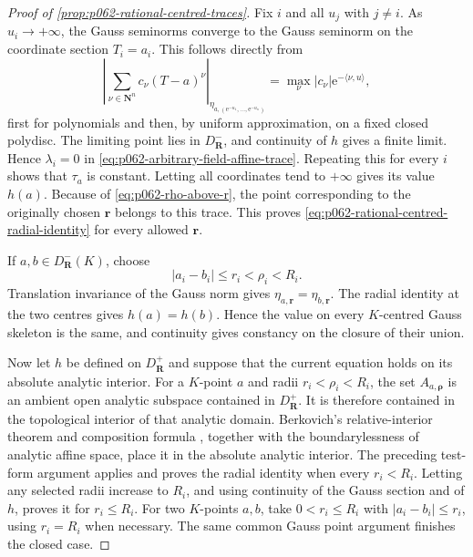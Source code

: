 \begin{proof}[Proof of \cref{prop:p062-rational-centred-traces}]
Fix \(i\) and all \(u_j\) with \(j\ne i\).  As \(u_i\to+\infty\), the
Gauss seminorms converge to the Gauss seminorm on the coordinate section
\(T_i=a_i\).  This follows directly from
\[
 \left|\sum_{\nu\in\mathbf N^n}c_\nu(T-a)^\nu\right|_{
      \eta_{a,(\mathrm e^{-u_1},\ldots,\mathrm e^{-u_n})}}
       =\max_\nu |c_\nu|\mathrm e^{-\langle\nu,u\rangle},
\]
first for polynomials and then, by uniform approximation, on a fixed
closed polydisc.  The limiting point lies in \(D^-_{\mathbf R}\), and
continuity of \(h\) gives a finite limit.  Hence \(\lambda_i=0\) in
\eqref{eq:p062-arbitrary-field-affine-trace}.  Repeating this for every
\(i\) shows that \(\tau_a\) is constant.  Letting all coordinates tend
to \(+\infty\) gives its value \(h(a)\).  Because of
\eqref{eq:p062-rho-above-r}, the point corresponding to the originally
chosen \(\mathbf r\) belongs to this trace.  This proves
\eqref{eq:p062-rational-centred-radial-identity} for every allowed
\(\mathbf r\).

If \(a,b\in D^-_{\mathbf R}(K)\), choose
\[
                  |a_i-b_i|\leq r_i<\rho_i<R_i.
\]
Translation invariance of the Gauss norm gives
\(\eta_{a,\mathbf r}=\eta_{b,\mathbf r}\).  The radial identity at the
two centres gives \(h(a)=h(b)\).  Hence the value on every \(K\)-centred
Gauss skeleton is the same, and continuity gives constancy on the closure
of their union.

Now let \(h\) be defined on \(D^+_{\mathbf R}\) and suppose that the
current equation holds on its absolute analytic interior.  For a
\(K\)-point \(a\) and radii \(r_i<\rho_i<R_i\), the set
\(A_{a,\boldsymbol\rho}\) is an ambient open analytic subspace contained
in \(D^+_{\mathbf R}\).  It is therefore contained in the topological
interior of that analytic domain.  Berkovich's relative-interior theorem
and composition formula
\cite[Proposition~1.5.5(i)--(ii)]{Berk93}, together with the
boundarylessness of analytic affine space, place it in the absolute
analytic interior.  The preceding test-form argument applies and proves
the radial identity when every \(r_i<R_i\).  Letting any selected radii
increase to \(R_i\), and using continuity of the Gauss section and of
\(h\), proves it for \(r_i\leq R_i\).  For two \(K\)-points \(a,b\), take
\(0<r_i\leq R_i\) with
\(|a_i-b_i|\leq r_i\), using \(r_i=R_i\) when necessary.  The same common
Gauss point argument finishes the closed case.
\end{proof}


